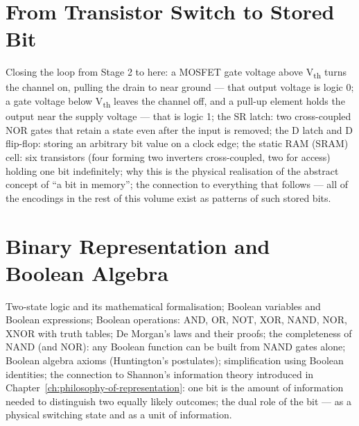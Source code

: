 \chapter{From Transistor Switch to Stored Bit}
\label{ch:switch-to-bit}

Closing the loop from Stage 2 to here: a MOSFET gate voltage above
V\textsubscript{th} turns the channel on, pulling the drain to near ground —
that output voltage is logic 0; a gate voltage below V\textsubscript{th}
leaves the channel off, and a pull-up element holds the output near the
supply voltage — that is logic 1; the SR latch: two cross-coupled NOR
gates that retain a state even after the input is removed; the D latch
and D flip-flop: storing an arbitrary bit value on a clock edge; the
static RAM (SRAM) cell: six transistors (four forming two inverters
cross-coupled, two for access) holding one bit indefinitely; why this
is the physical realisation of the abstract concept of ``a bit in memory'';
the connection to everything that follows — all of the encodings in
the rest of this volume exist as patterns of such stored bits.



\chapter{Binary Representation and Boolean Algebra}
\label{ch:binary-boolean}

Two-state logic and its mathematical formalisation; Boolean variables and
Boolean expressions; Boolean operations: AND, OR, NOT, XOR, NAND, NOR, XNOR
with truth tables; De Morgan's laws and their proofs; the completeness of
NAND (and NOR): any Boolean function can be built from NAND gates alone;
Boolean algebra axioms (Huntington's postulates); simplification using
Boolean identities; the connection to Shannon's information theory
introduced in Chapter~\ref{ch:philosophy-of-representation}: one bit is
the amount of information needed to distinguish two equally likely outcomes;
the dual role of the bit — as a physical switching state and as a unit of
information.


